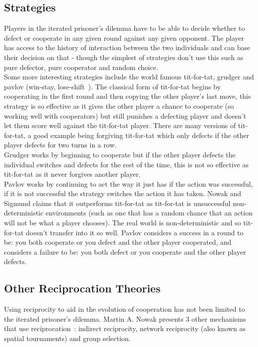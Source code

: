 \documentclass[twoside,twocolumn]{article}
\begin{document}
\subsection{Strategies}
Players in the iterated prisoner's dilemma have to be able to decide whether to defect or cooperate in any given round against any given opponent. The player has access to the history of interaction between the two individuals and can base their decision on that - though the simplest of strategies don't use this such as pure defector, pure cooperator and random choice.\\
Some more interesting strategies include the world famous tit-for-tat, grudger and pavlov (win-stay, lose-shift~\cite{nowak-1993a}). The classical form of tit-for-tat begins by cooperating in the first round and then copying the other player's last move, this strategy is so effective as it gives the other player a chance to cooperate (so working well with cooperators) but still punishes a defecting player and doesn't let them score well against the tit-for-tat player. There are many versions of tit-for-tat, a good example being forgiving tit-for-tat which only defects if the other player defects for two turns in a row.\\
Grudger works by beginning to cooperate but if the other player defects the individual switches and defects for the rest of the time, this is not so effective as tit-for-tat as it never forgives another player.\\
Pavlov works by continuing to act the way it just has if the action was successful, if it is not successful the strategy switches the action it has taken. Nowak and Sigmund claims that it outperforms tit-for-tat as tit-for-tat is unsuccessful non-deterministic environments (such as one that has a random chance that an action will not be what a player chooses). The real world is non-deterministic and so tit-for-tat doesn't transfer into it so well. Pavlov considers a success in a round to be: you both cooperate or you defect and the other player cooperated, and considers a failure to be: you both defect or you cooperate and the other player defects.

\subsection{Other Reciprocation Theories}
Using reciprocity to aid in the evolution of cooperation has not been limited to the iterated prisoner's dilemma. Martin A. Nowak presents 3 other mechanisms that use reciprocation~\cite{five_rules_coop}: indirect reciprocity, network reciprocity (also known as spatial tournaments) and group selection.
\end{document}
